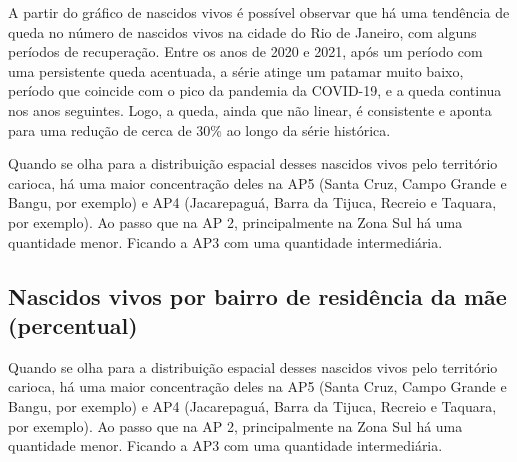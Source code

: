 A partir do gráfico de nascidos vivos é possível observar que há uma tendência de queda no número de nascidos vivos na cidade do Rio de Janeiro, com alguns períodos de recuperação. Entre os anos de 2020 e 2021, após um período com uma persistente queda acentuada, a série atinge um patamar muito baixo, período que coincide com o pico da pandemia da COVID-19, e a queda continua nos anos seguintes. Logo, a queda, ainda que não linear, é consistente e aponta para uma redução de cerca de 30\% ao longo da série histórica.


Quando se olha para a distribuição espacial desses nascidos vivos pelo território carioca, há uma maior concentração deles na AP5 (Santa Cruz, Campo Grande e Bangu, por exemplo) e AP4 (Jacarepaguá, Barra da Tijuca, Recreio e Taquara, por exemplo). Ao passo que na AP 2, principalmente na Zona Sul há uma quantidade menor. Ficando a AP3 com uma quantidade intermediária.


\subsection{Nascidos vivos por bairro de residência da mãe (percentual)}


Quando se olha para a distribuição espacial desses nascidos vivos pelo território carioca, há uma maior concentração deles na AP5 (Santa Cruz, Campo Grande e Bangu, por exemplo) e AP4 (Jacarepaguá, Barra da Tijuca, Recreio e Taquara, por exemplo). Ao passo que na AP 2, principalmente na Zona Sul há uma quantidade menor. Ficando a AP3 com uma quantidade intermediária.


